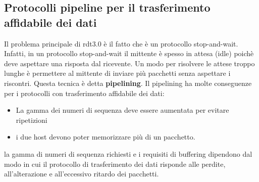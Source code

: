 \documentclass[11pt,a4paper]{book}
\begin{document}
\subsection{Protocolli pipeline per il trasferimento affidabile dei dati}
Il problema principale di rdt3.0 è il fatto che è un protocollo stop-and-wait. Infatti, in un protocollo stop-and-wait il mittente è spesso in attesa (idle) poichè deve aspettare una risposta dal ricevente. Un modo per risolvere le attese troppo lunghe è permettere al mittente di inviare più pacchetti senza aspettare i riscontri. Questa tecnica è detta \textbf{pipelining}. Il pipelining ha molte conseguenze per i protocolli con trasferimento affidabile dei dati:
\begin{itemize}
	\item La gamma dei numeri di sequenza deve essere aumentata per evitare ripetizioni
	\item i due host devono poter memorizzare più di un pacchetto.
\end{itemize}
la gamma di numeri di sequenza richiesti e i requisiti di buffering dipendono dal modo in cui il protocollo di trasferimento dei dati risponde alle perdite, all'alterazione e all'eccessivo ritardo dei pacchetti.
\end{document}
